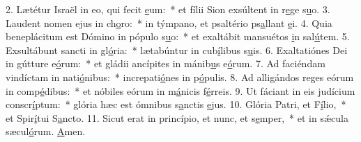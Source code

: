 2. Lætétur Israël in eo, qui fecit \uline{e}um:~* et fílii Sion exsúltent in r\uline{e}ge s\uline{u}o.
3. Laudent nomen ejus in ch\uline{o}ro:~* in týmpano, et psaltério ps\uline{a}llant \uline{e}i.
4. Quia beneplácitum est Dómino in pópulo s\uline{u}o:~* et exaltábit mansuétos \uline{i}n sal\uline{ú}tem.
5. Exsultábunt sancti in gl\uline{ó}ria:~* lætabúntur in cub\uline{í}libus s\uline{u}is.
6. Exaltatiónes Dei in gútture e\uline{ó}rum:~* et gládii ancípites in mánib\uline{u}s e\uline{ó}rum.
7. Ad faciéndam vindíctam in nati\uline{ó}nibus:~* increpati\uline{ó}nes in p\uline{ó}pulis.
8. Ad alligándos reges eórum in comp\uline{é}dibus:~* et nóbiles eórum in m\uline{á}nicis f\uline{é}rreis.
9. Ut fáciant in eis judícium conscr\uline{í}ptum:~* glória hæc est ómnibus s\uline{a}nctis \uline{e}jus.
10. Glória Patri, et F\uline{í}lio,~* et Spir\uline{í}tui S\uline{a}ncto.
11. Sicut erat in princípio, et nunc, et s\uline{e}mper,~* et in sǽcula sæcul\uline{ó}rum. \uline{A}men.
